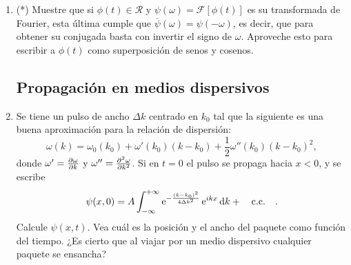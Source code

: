 \documentclass[11pt,spanish,a4paper]{article}
\begin{document}
\begin{enumerate}
\item (*) Muestre que si $\phi(t) \in \mathcal{R}$ y $\psi(\omega)= \mathcal{F} \left[ \phi (t) \right]$ es su transformada de Fourier, esta última cumple que \( \overline{\psi}(\omega) = \psi(- \omega) \), es decir, que para obtener su conjugada basta con invertir el signo de $\omega$.
	Aproveche esto para escribir a $\phi(t)$ como superposición de senos y cosenos.



\subsection*{Propagación en medios dispersivos}

\item Se tiene un pulso de ancho $\Delta k$ centrado en $k_0$ tal que la siguiente es una buena aproximación para la relación de dispersión:
\[
	\omega(k) = \omega_0 (k_0) + \omega'(k_0) (k - k_0) + \frac{1}{2} \omega'' (k_0) ( k - k_0 )^2,
\]
donde \(\omega'= \pdv{\omega}{k}\) y  \(\omega''= \pdv[2]{\omega}{k}\).
Si en $t=0$ el pulso se propaga hacia $x<0$, y se escribe
\[
	\psi(x,0) = A \int_{-\infty}^{+\infty} \operatorname{e}^{ - \frac{ ( k - k_0 )^2 }{ 4 \Delta k^2 } } \operatorname{e}^{ i k x } \dd{k} + \qq{c.c.}.
\]
Calcule $\psi(x,t)$.
Vea cuál es la posición y el ancho del paquete como función del tiempo.
¿Es cierto que al viajar por un medio dispersivo cualquier paquete se ensancha?





\end{enumerate}
\end{document}

